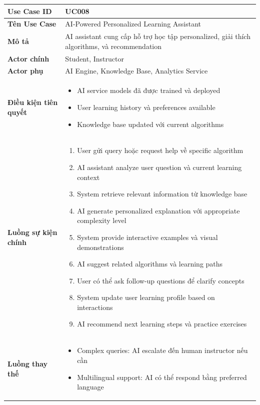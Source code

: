 \begin{longtable}{|p{4cm}|p{10cm}|}
\hline
\textbf{Use Case ID} & UC008 \\ \hline
\textbf{Tên Use Case} & AI-Powered Personalized Learning Assistant \\ \hline
\textbf{Mô tả} & AI assistant cung cấp hỗ trợ học tập personalized, giải thích algorithms, và recommendation \\ \hline
\textbf{Actor chính} & Student, Instructor \\ \hline
\textbf{Actor phụ} & AI Engine, Knowledge Base, Analytics Service \\ \hline
\textbf{Điều kiện tiên quyết} & 
\begin{itemize}
    \item AI service models đã được trained và deployed
    \item User learning history và preferences available
    \item Knowledge base updated với current algorithms
\end{itemize} \\ \hline
\textbf{Luồng sự kiện chính} & 
\begin{enumerate}
    \item User gửi query hoặc request help về specific algorithm
    \item AI assistant analyze user question và current learning context
    \item System retrieve relevant information từ knowledge base
    \item AI generate personalized explanation với appropriate complexity level
    \item System provide interactive examples và visual demonstrations
    \item AI suggest related algorithms và learning paths
    \item User có thể ask follow-up questions để clarify concepts
    \item System update user learning profile based on interactions
    \item AI recommend next learning steps và practice exercises
\end{enumerate} \\ \hline
\textbf{Luồng thay thế} & 
\begin{itemize}
    \item Complex queries: AI escalate đến human instructor nếu cần
    \item Multilingual support: AI có thể respond bằng preferred language

\end{itemize}
\end{longtable}

